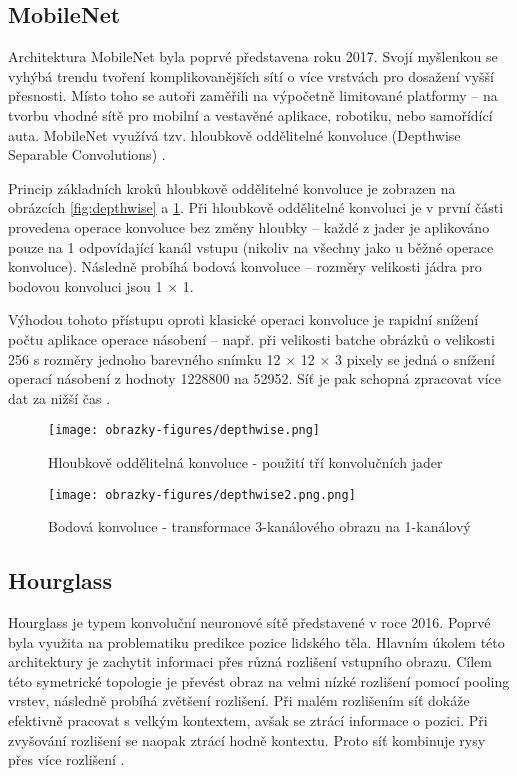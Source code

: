 \subsection*{MobileNet}
Architektura MobileNet byla poprvé představena roku 2017. Svojí myšlenkou se vyhýbá trendu tvoření komplikovanějších sítí o více vrstvách pro dosažení vyšší přesnosti. Místo toho se autoři zaměřili na výpočetně limitované platformy -- na tvorbu vhodné sítě pro mobilní a vestavěné aplikace, robotiku, nebo samořídící auta. MobileNet využívá tzv. hloubkově oddělitelné konvoluce (Depthwise Separable Convolutions) \cite{MobileNet}.

Princip základních kroků hloubkově oddělitelné konvoluce je zobrazen na obrázcích \ref{fig:depthwise} a \ref{fig:depthwise2}. Při hloubkově oddělitelné konvoluci je v první části provedena operace konvoluce bez změny hloubky -- každé z jader je aplikováno pouze na 1 odpovídající kanál vstupu (nikoliv na všechny jako u běžné operace konvoluce). Následně probíhá bodová konvoluce -- rozměry velikosti jádra pro bodovou konvoluci jsou 1 $\times$ 1.

Výhodou tohoto přístupu oproti klasické operaci konvoluce je rapidní snížení počtu aplikace operace násobení -- např. při velikosti batche obrázků o velikosti 256 s rozměry jednoho barevného snímku 12 $\times$ 12 $\times$ 3 pixely se jedná o snížení operací násobení z hodnoty 1228800 na 52952. Síť je pak schopná zpracovat více dat za nižší čas \cite{SeparableConvolutions}. 

\begin{figure}[!htbp]
  \begin{minipage}[b]{0.5\linewidth}
    \centering
    \texttt{[image: obrazky-figures/depthwise.png]}
    \caption{Hloubkově oddělitelná konvoluce - použití tří konvolučních jader \cite{SeparableConvolutions}}
    \label{fig:depthwise}
  \end{minipage}
  \hspace{0.5cm}
  \begin{minipage}[b]{0.5\linewidth}
    \centering
    \texttt{[image: obrazky-figures/depthwise2.png.png]}
    \caption{Bodová konvoluce - transformace 3-kanálového obrazu na 1-kanálový \cite{SeparableConvolutions}}
    \label{fig:depthwise2}
  \end{minipage}
\end{figure}

\subsection*{Hourglass}
Hourglass je typem konvoluční neuronové sítě představené v roce 2016. Poprvé byla využita na problematiku predikce pozice lidského těla. Hlavním úkolem této architektury je zachytit informaci přes různá rozlišení vstupního obrazu. Cílem této symetrické topologie je převést obraz na velmi nízké rozlišení pomocí pooling vrstev, následně probíhá zvětšení rozlišení. Při malém rozlišením síť dokáže efektivně pracovat s velkým kontextem, avšak se ztrácí informace o pozici. Při zvyšování rozlišení se naopak ztrácí hodně kontextu. Proto síť kombinuje rysy přes více rozlišení \cite{Hourglass}.

